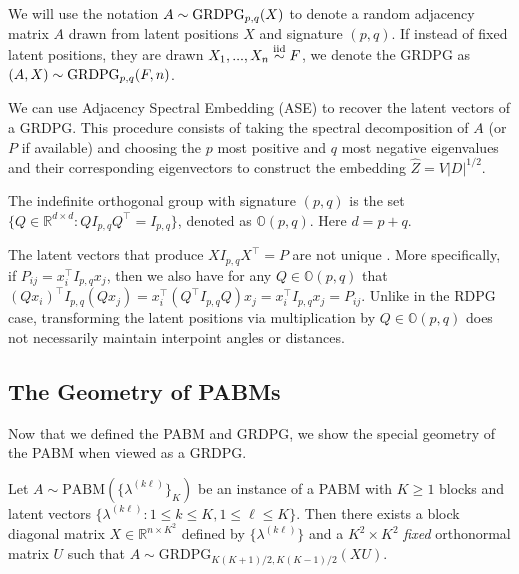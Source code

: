 \documentclass[12pt]{article}
\begin{document}
We will use the notation \(A \sim \mathrm{GRDPG}_{p,q}(X)\) to denote a random
adjacency matrix \(A\) drawn from latent positions \(X\) and signature
\((p, q)\). If instead of fixed latent positions, 
they are drawn $X_1, ..., X_n \stackrel{\mathrm{iid}}{\sim} F$, 
we denote the GRDPG as $(A, X) \sim \mathrm{GRDPG}_{p,q}(F, n)$.

\begin{remark}
We can use Adjacency Spectral Embedding (ASE) 
\citep{doi:10.1080/01621459.2012.699795} to recover the latent vectors of a GRDPG. 
This procedure consists of taking the spectral decomposition of $A$ 
(or $P$ if available) and choosing the $p$ most positive and $q$ most negative
eigenvalues and their corresponding eigenvectors 
to construct the embedding $\hat{Z} = V |D|^{1/2}$. 
\end{remark}

\begin{definition}
The indefinite orthogonal group with signature $(p, q)$ is
the set $\{Q \in \mathbb{R}^{d \times d} \colon Q I_{p, q} Q^{\top} = I_{p, q}\}$,
denoted as $\mathbb{O}(p, q)$. Here $d = p + q$. 
\end{definition}

\begin{remark}
The latent vectors that produce $X I_{p,q} X^\top = P$ are not unique
\citep{rubindelanchy2017statistical}.
More specifically, if $P_{ij} = x_i^\top I_{p, q} x_j$, 
then we also have for any $Q \in \mathbb{O}(p, q)$ that
$(Q x_i)^\top I_{p, q} (Q x_j) = x_i^\top (Q^\top I_{p, q} Q) x_j =
x_i^\top I_{p, q} x_j = P_{ij}$.
Unlike in the RDPG case, transforming the latent positions via multiplication
by $Q \in \mathbb{O}(p, q)$ does not necessarily maintain interpoint angles or
distances.
\end{remark}

\hypertarget{connecting-the-pabm-to-the-grdpg}{%
\subsection{The Geometry of PABMs}\label{connecting-the-pabm-to-the-grdpg}}

Now that we defined the PABM and GRDPG, 
we show the special geometry of the PABM when viewed as a GRDPG. 

\begin{theorem}
\label{theorem2}
Let $A \sim \mathrm{PABM}(\{\lambda^{(k \ell)}\}_K)$ be an instance of a
PABM with $K \geq 1$ blocks and latent vectors $\{\lambda^{(k \ell)}
\colon 1 \leq k \leq K, 1 \leq \ell \leq K\}$. 
Then there exists a block diagonal matrix
$X \in \mathbb{R}^{n \times K^2}$ defined by $\{\lambda^{(k \ell)}\}$ and a 
$K^2 \times K^2$ {\em fixed} orthonormal matrix $U$ such 
that $A \sim \mathrm{GRDPG}_{K (K+1) / 2, K (K-1) / 2}(XU)$.
\end{theorem}
\end{document}
